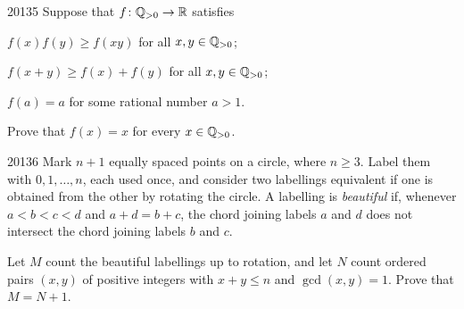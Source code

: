 \begin{problem}{2013}{5}
Suppose that $f\colon\mathbb{Q}_{>0}\to\mathbb{R}$ satisfies
\begin{problemclauses}
    \item $f(x)f(y)\geq f(xy)$ for all $x, y\in\mathbb{Q}_{>0}$;
    \item $f(x+y)\geq f(x)+f(y)$ for all $x, y\in\mathbb{Q}_{>0}$;
    \item $f(a)=a$ for some rational number $a>1$.
\end{problemclauses}
Prove that $f(x)=x$ for every $x\in\mathbb{Q}_{>0}$.
\end{problem}

\begin{problem}{2013}{6}
Mark $n+1$ equally spaced points on a circle, where $n\geq3$. Label them with $0, 1, \dots, n$, each used once, and consider two labellings equivalent if one is obtained from the other by rotating the circle. A labelling is \emph{beautiful} if, whenever $a<b<c<d$ and $a+d=b+c$, the chord joining labels $a$ and $d$ does not intersect the chord joining labels $b$ and $c$.

Let $M$ count the beautiful labellings up to rotation, and let $N$ count ordered pairs $(x, y)$ of positive integers with $x+y\leq n$ and $\gcd(x, y)=1$. Prove that $M=N+1$.
\end{problem}
